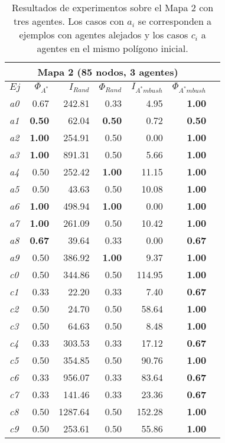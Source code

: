 \begin{table}[htb]
\begin{center}
\begin{tabular}{|l|r|r|r|r|r|r|}
\hline
\multicolumn{6}{|c|}{\textbf{Mapa 2 (85 nodos, 3 agentes)}}\\
\hline
$Ej$ & $\Phi_{A^*}$ & $I_{Rand}$ & $\Phi_{Rand}$
& $I_{A^*mbush}$ & $\Phi_{A^*mbush}$\\
\hline
\textit{a0} & 0.67 & 242.81 & 0.33 & 4.95 & \textbf{1.00} \\
\textit{a1} & \textbf{0.50} & 62.04 & \textbf{0.50} & 0.72 & \textbf{0.50} \\
\textit{a2} & \textbf{1.00} & 254.91 & 0.50 & 0.00 & \textbf{1.00} \\
\textit{a3} & \textbf{1.00} & 891.31 & 0.50 & 5.66 & \textbf{1.00} \\
\textit{a4} & 0.50 & 252.42 & \textbf{1.00} & 11.15 & \textbf{1.00} \\
\textit{a5} & 0.50 & 43.63 & 0.50 & 10.08 & \textbf{1.00} \\
\textit{a6} & \textbf{1.00} & 498.94 & \textbf{1.00} & 0.00 & \textbf{1.00} \\
\textit{a7} & \textbf{1.00} & 261.09 & 0.50 & 10.42 & \textbf{1.00} \\
\textit{a8} & \textbf{0.67} & 39.64 & 0.33 & 0.00 & \textbf{0.67} \\
\textit{a9} & 0.50 & 386.92 & \textbf{1.00} & 9.37 & \textbf{1.00} \\
\hline
\hline
\textit{c0} & 0.50 & 344.86 & 0.50 & 114.95 & \textbf{1.00} \\
\textit{c1} & 0.33 & 22.20 & 0.33 & 7.40 & \textbf{0.67} \\
\textit{c2} & 0.50 & 24.70 & 0.50 & 58.64 & \textbf{1.00} \\
\textit{c3} & 0.50 & 64.63 & 0.50 & 8.48 & \textbf{1.00} \\
\textit{c4} & 0.33 & 303.53 & 0.33 & 17.12 & \textbf{0.67} \\
\textit{c5} & 0.50 & 354.85 & 0.50 & 90.76 & \textbf{1.00} \\
\textit{c6} & 0.33 & 956.07 & 0.33 & 83.64 & \textbf{0.67} \\
\textit{c7} & 0.33 & 141.46 & 0.33 & 23.36 & \textbf{0.67} \\
\textit{c8} & 0.50 & 1287.64 & 0.50 & 152.28 & \textbf{1.00} \\
\textit{c9} & 0.50 & 253.61 & 0.50 & 55.86 & \textbf{1.00} \\
\hline
\end{tabular}
\end{center}
	\caption{\label{tab:exp2}
	     Resultados de experimentos sobre el Mapa 2 con tres agentes. Los casos
	     con $a_i$ se corresponden a ejemplos con agentes alejados
	     y los casos $c_i$ a agentes en el mismo polígono inicial.}
\end{table}